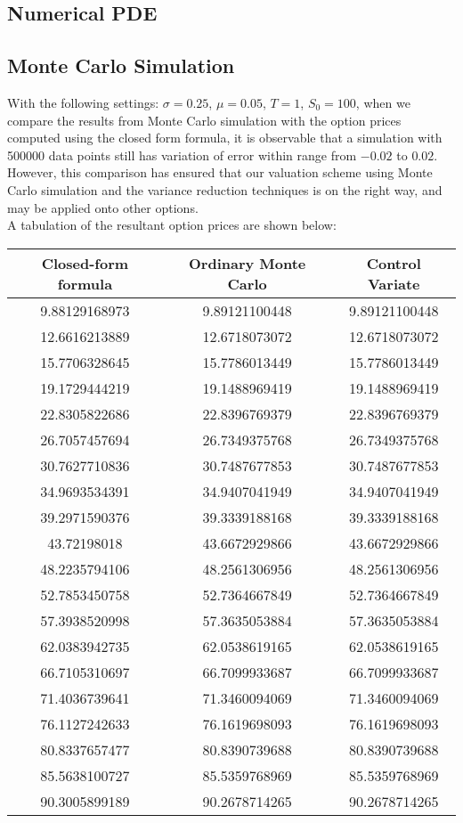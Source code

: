 \subsection{Numerical PDE}
\newpage
\subsection{Monte Carlo Simulation}
With the following settings: $\sigma = 0.25$, $\mu = 0.05$, $T = 1$, $S_{0} = 100$, 
when we compare the results from Monte Carlo simulation with the option prices computed using the closed form formula, it is observable that a simulation with 500000 data points still has variation of error within range from $-0.02$ to $0.02$. However, this comparison has ensured that our valuation scheme using Monte Carlo simulation and the variance reduction techniques is on the right way, and may be applied onto other options.\\
A tabulation of the resultant option prices are shown below:
\begin{center}
\begin{tabular}{|c|c|c|}
\hline
Closed-form formula & Ordinary Monte Carlo & Control Variate\\
\hline
9.88129168973 &9.89121100448 & 9.89121100448 \\
12.6616213889 &12.6718073072 & 12.6718073072 \\
15.7706328645 &15.7786013449 & 15.7786013449 \\
19.1729444219 &19.1488969419 & 19.1488969419 \\
22.8305822686 &22.8396769379 & 22.8396769379 \\
26.7057457694 &26.7349375768 & 26.7349375768 \\
30.7627710836 &30.7487677853 & 30.7487677853 \\
34.9693534391 &34.9407041949 & 34.9407041949 \\
39.2971590376 &39.3339188168 & 39.3339188168 \\
43.72198018 &  43.6672929866 & 43.6672929866 \\
48.2235794106 &48.2561306956 & 48.2561306956 \\
52.7853450758 &52.7364667849 & 52.7364667849 \\
57.3938520998 &57.3635053884 & 57.3635053884 \\
62.0383942735 &62.0538619165 & 62.0538619165 \\
66.7105310697 &66.7099933687 & 66.7099933687 \\
71.4036739641 &71.3460094069 & 71.3460094069 \\
76.1127242633 &76.1619698093 & 76.1619698093 \\
80.8337657477 &80.8390739688 & 80.8390739688 \\
85.5638100727 &85.5359768969 & 85.5359768969 \\
90.3005899189 &90.2678714265 & 90.2678714265 \\
\hline
\end{tabular}
\end{center}
\newpage

